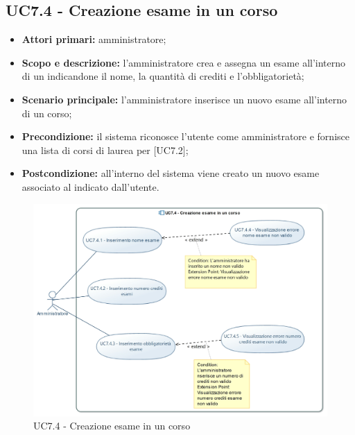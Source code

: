 \documentclass[AnalisiDeiRequisiti.tex]{subfiles}
\begin{document}
\subsection{UC7.4 - Creazione esame in un corso}
\begin{itemize}
	\item \textbf{Attori primari:} amministratore;
	\item \textbf{Scopo e descrizione:} l'amministratore crea e assegna un esame all'interno di un  indicandone il nome, la quantità di crediti e l'obbligatorietà;
	\item \textbf{Scenario principale:} l'amministratore inserisce un nuovo esame all'interno di un corso;
	\item \textbf{Precondizione:} il sistema riconosce l'utente come amministratore e fornisce una lista di corsi di laurea per  [UC7.2];
	\item \textbf{Postcondizione:} all'interno del sistema viene creato un nuovo esame associato al  indicato dall'utente.
\end{itemize}
\begin{figure}[H]
	\centering
	\includegraphics[width=1.0\linewidth]{UC7_4.jpg}
	\caption{UC7.4 - Creazione esame in un corso}
	\label{fig:UC7.4 - Creazione esame in un corso}
\end{figure}
\end{document}
